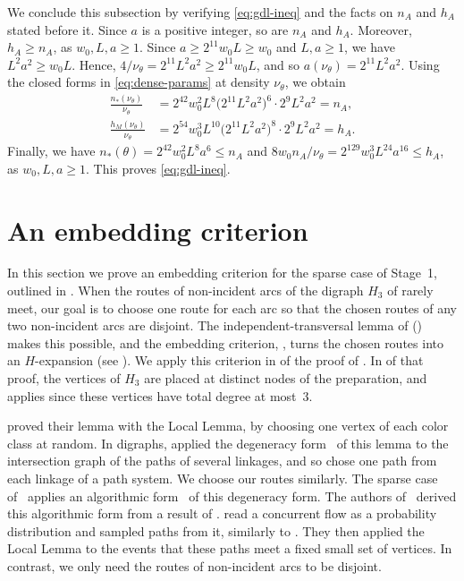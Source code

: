 \documentclass[fontsize=12pt,leading=14pt]{fullpaper}
\newcounter{step}
\begin{document}
We conclude this subsection by verifying \eqref{eq:gdl-ineq} and the facts on $n_A$ and $h_A$ stated before it.
Since $a$ is a positive integer, so are $n_A$ and $h_A$.
Moreover, $h_A\ge n_A$, as $w_0,L,a\ge1$.
Since $a\ge2^{11}w_0L\ge w_0$ and $L,a\ge1$, we have $L^2a^2\ge w_0L$.
Hence, $4/\nu_\theta=2^{11}L^2a^2\ge2^{11}w_0L$, and so $a(\nu_\theta)=2^{11}L^2a^2$.
Using the closed forms in \eqref{eq:dense-params} at density $\nu_\theta$, we obtain
\begin{align*}
  \frac{n_*(\nu_\theta)}{\nu_\theta}&=2^{42}w_0^2L^8\bigl(2^{11}L^2a^2\bigr)^6\cdot2^9L^2a^2=n_A,\\
  \frac{h_M(\nu_\theta)}{\nu_\theta}&=2^{54}w_0^3L^{10}\bigl(2^{11}L^2a^2\bigr)^8\cdot2^9L^2a^2=h_A.
\end{align*}
Finally, we have $n_*(\theta)=2^{42}w_0^2L^8a^6\le n_A$ and $8w_0n_A/\nu_\theta=2^{129}w_0^3L^{24}a^{16}\le h_A$, as $w_0,L,a\ge1$.
This proves \eqref{eq:gdl-ineq}.

%
\section{An embedding criterion}\label{sec:embed}

In this section we prove an embedding criterion for the sparse case of Stage~1, outlined in .
When the routes of non-incident arcs of the digraph $H_3$ of  rarely meet, our goal is to choose one route for each arc so that the chosen routes of any two non-incident arcs are disjoint.
The independent-transversal lemma of \textcite{RW12} () makes this possible, and the embedding criterion, , turns the chosen routes into an $H$-expansion (see ).
We apply this criterion in  of the proof of .
In  of that proof, the vertices of $H_3$ are placed at distinct nodes of the preparation, and  applies since these vertices have total degree at most~$3$.

\textcite{RW12} proved their lemma with the Local Lemma, by choosing one vertex of each color class at random.
In digraphs, \textcite[proof of Lemma~3.3]{MPRS22} applied the degeneracy form~\cite[Lemma~4.3]{RW12} of this lemma to the intersection graph of the paths of several linkages, and so chose one path from each linkage of a path system.
We choose our routes similarly.
The sparse case of~\cite[Lemma~5.3]{CLNS26} applies an algorithmic form~\cite[Proposition~3.9]{CLNS26} of this degeneracy form.
The authors of~\cite{CLNS26} derived this algorithmic form from a result of \textcite[Theorem~1.5]{Harris22}.
\textcite[Section~4]{HKPS22} read a concurrent flow as a probability distribution and sampled paths from it, similarly to \textcite{GroheM09}.
They then applied the Local Lemma to the events that these paths meet a fixed small set of vertices.
In contrast, we only need the routes of non-incident arcs to be disjoint.
\end{document}

